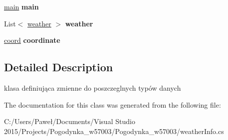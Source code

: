 \begin{DoxyCompactItemize}
\mbox{\hyperlink{class_pogodynka__w57003_1_1_weather_info_1_1main}{main}} {\bfseries main}
\item 
\mbox{\label{class_pogodynka__w57003_1_1_weather_info_1_1_root_a190f5bef130c1534292fd2d6f1011ecb}} 
List$<$ \mbox{\hyperlink{class_pogodynka__w57003_1_1_weather_info_1_1weather}{weather}} $>$ {\bfseries weather}
\item 
\mbox{\label{class_pogodynka__w57003_1_1_weather_info_1_1_root_ad81df4d32e660bf1c4915c0c0e22eb85}} 
\mbox{\hyperlink{class_pogodynka__w57003_1_1_weather_info_1_1coord}{coord}} {\bfseries coordinate}
\end{DoxyCompactItemize}


\subsection{Detailed Description}
klasa definiująca zmienne do poszczeglnych typów danych 



The documentation for this class was generated from the following file\+:\begin{DoxyCompactItemize}
\item 
C\+:/\+Users/\+Paweł/\+Documents/\+Visual Studio 2015/\+Projects/\+Pogodynka\+\_\+w57003/\+Pogodynka\+\_\+w57003/weather\+Info.\+cs\end{DoxyCompactItemize}
